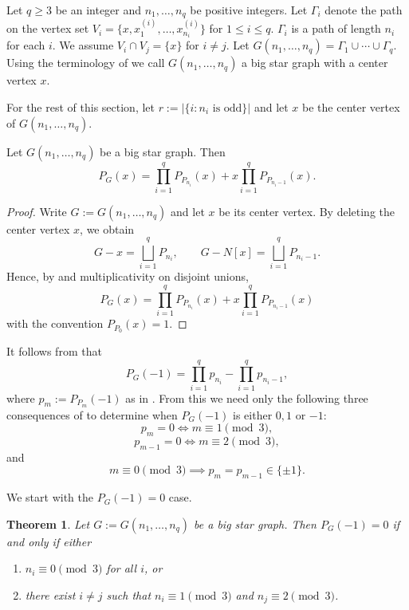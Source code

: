 \documentclass[12pt]{amsart}
\theoremstyle{plain}
\newtheorem{thm}{Theorem}[section]
\theoremstyle{definition}
\begin{document}
\begin{defn}
    Let $q\geq 3$ be an integer and $n_1,\ldots, n_q$ be positive integers. Let $\Gamma_i$ denote the path on the vertex set $V_i=\{x,x_1^{(i)}, \ldots, x_{n_i}^{(i)}\}$ for $1\leq i\leq q$. $\Gamma_i$ is a path of length $n_i$ for each $i$. We assume $V_i\cap V_j = \{x\}$ for $i\neq j$. Let $G(n_1,\ldots, n_q)=\Gamma_1\cup \cdots \cup \Gamma_q$. Using the terminology of \cite[Definition 5.9]{bhaskara2025levelable} we call $G(n_1,\ldots, n_q)$ a big star graph with a center vertex $x$.

    For the rest of this section, let  \(r:=|\{ i : n_i \text{ is odd} \}|\) and let $x$ be the center vertex of $G(n_1,\ldots, n_q)$.
\end{defn}


\begin{lem}\label{lem:big_star}
Let $G(n_1,\ldots,n_q)$ be a big star graph. Then 
\[P_G(x)=\prod_{i=1}^q P_{P_{n_i}}(x)+x\prod_{i=1}^q P_{P_{n_i-1}}(x).\]
\end{lem}

\begin{proof}
Write $G:=G(n_1,\ldots,n_q)$ and let $x$ be its center vertex.  By deleting the center vertex $x$, we obtain
\[
G-x=\bigsqcup_{i=1}^q P_{n_i},
\qquad
G-N[x]=\bigsqcup_{i=1}^q P_{n_i-1}.
\]
Hence, by  and multiplicativity on disjoint unions,
\[P_G(x)=\prod_{i=1}^q P_{P_{n_i}}(x)+x\prod_{i=1}^q P_{P_{n_i-1}}(x)\]
with the convention $P_{P_0}(x)=1$. 
\end{proof}


\begin{remark}\label{rem:big_star}
It follows from  that
\[
P_G(-1)=\prod_{i=1}^q p_{n_i}-\prod_{i=1}^q p_{n_i-1},
\]
where \(p_m:=P_{P_m}(-1)\) as in . 
From this we need only the following three consequences of   to determine when $P_G(-1)$ is either $0, 1$ or $-1$:
\[
p_m=0 \iff m\equiv 1\pmod 3,
\]
\[
p_{m-1}=0 \iff m\equiv 2\pmod 3,
\]
and
\[
m\equiv 0\pmod 3 \implies p_m=p_{m-1}\in\{\pm1\}.
\]
\end{remark}

We start with the $P_G(-1)=0$ case.


\begin{thm}\label{thm:big_star_0}
Let $G:=G(n_1,\ldots,n_q)$ be a big star graph. Then \(P_G(-1)=0\)
if and only if either
\begin{enumerate}
    \item $n_i\equiv 0 \pmod 3$ for all $i$, or
    \item there exist $i\neq j$ such that $n_i\equiv 1 \pmod 3$ and $n_j\equiv 2 \pmod 3$.
\end{enumerate}
\end{thm}
\end{document}
